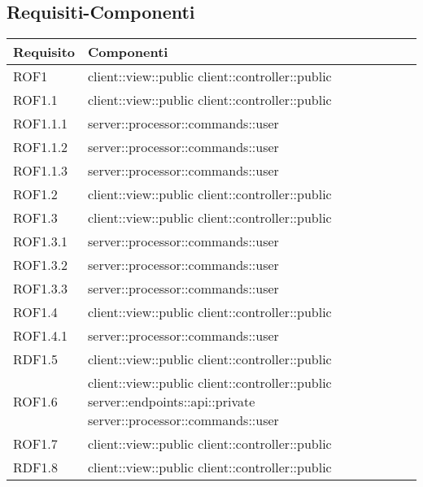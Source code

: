 \subsection{Requisiti-Componenti} %
\label{sub:componenti_requisiti}
\begin{center}
\def\arraystretch{1.5}
\bgroup
\begin{longtable}{| p{4cm} | p{8cm} |}
\hline
\textbf{Requisito} & \textbf{Componenti} \\
\hline
ROF1 & client::view::public \newline client::controller::public \\
\hline
ROF1.1 & client::view::public \newline client::controller::public \\
\hline
ROF1.1.1 & server::processor::commands::user \\
\hline
ROF1.1.2 & server::processor::commands::user \\
\hline
ROF1.1.3 & server::processor::commands::user \\
\hline
ROF1.2 & client::view::public \newline client::controller::public \\
\hline
ROF1.3 & client::view::public \newline client::controller::public \\
\hline
ROF1.3.1 & server::processor::commands::user \\
\hline
ROF1.3.2 & server::processor::commands::user \\
\hline
ROF1.3.3 & server::processor::commands::user \\
\hline
ROF1.4 & client::view::public \newline client::controller::public \\
\hline
ROF1.4.1 & server::processor::commands::user \\
\hline
RDF1.5 & client::view::public \newline client::controller::public \\
\hline
ROF1.6 & client::view::public \newline client::controller::public \newline server::endpoints::api::private \newline server::processor::commands::user \\
\hline
ROF1.7 & client::view::public \newline client::controller::public \\
\hline
RDF1.8 & client::view::public \newline client::controller::public \\

\end{longtable}
\end{center}
